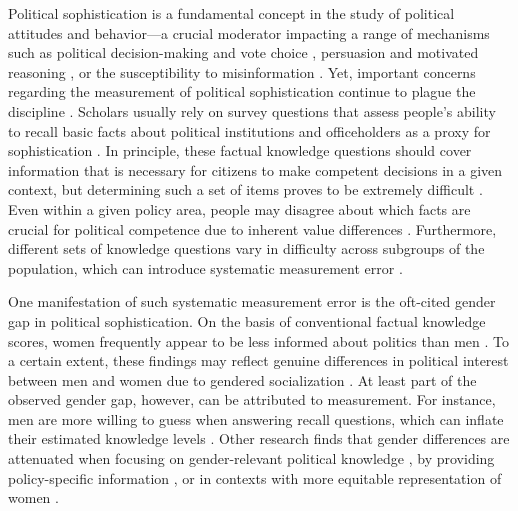 

\newpage\setcounter{page}{1}

Political sophistication is a fundamental concept in the study of political attitudes and behavior---a crucial moderator impacting a range of mechanisms such as political decision-making and vote choice \citep{macdonald1995political,lau2001advantages}, persuasion and motivated reasoning \citep{zaller1992nature,lodge2013rationalizing}, or the susceptibility to misinformation \citep{vegetti2020impact}. Yet, important concerns regarding the measurement of political sophistication continue to plague the discipline \citep{mondak2001developing,sturgis2008experiment,bullock2021response}. Scholars usually rely on survey questions that assess people's ability to recall basic facts about political institutions and officeholders as a proxy for sophistication \citep{carpini1993measuring,barabas2014question}. In principle, these factual knowledge questions should cover information that is necessary for citizens to make competent decisions in a given context, but determining such a set of items proves to be extremely difficult \citep{lupia2006elitism}. Even within a given policy area, people may disagree about which facts are crucial for political competence due to inherent value differences \citep{lupia2015uninformed}. Furthermore, different sets of knowledge questions vary in difficulty across subgroups of the population, which can introduce systematic measurement error \citep{pietryka2013analysis}.

One manifestation of such systematic measurement error is the oft-cited gender gap in political sophistication. On the basis of conventional factual knowledge scores, women frequently appear to be less informed about politics than men \citep{verba1997knowing,wolak2011roots,fraile2014women}. To a certain extent, these findings may reflect genuine differences in political interest between men and women due to gendered socialization \citep{bos2021one}. At least part of the observed gender gap, however, can be attributed to measurement. For instance, men are more willing to guess when answering recall questions, which can inflate their estimated knowledge levels \citep{mondak2004knowledge,fortin2020political}. Other research finds that gender differences are attenuated when focusing on gender-relevant political knowledge \citep{dolan2011women}, by providing policy-specific information \citep{jerit2017revisiting}, or in contexts with more equitable representation of women \citep{pereira2019gendered,kraft2022glass}.

